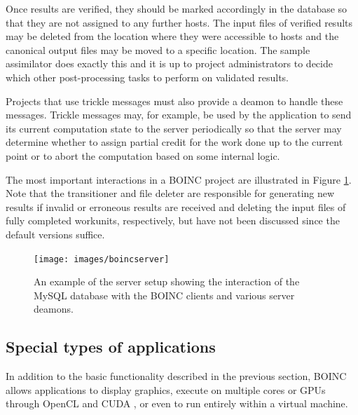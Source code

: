 Once results are verified, they should be marked accordingly in the database so that they are not assigned to any further hosts. The input files of verified results may be deleted from the location where they were accessible to hosts and the canonical output files may be moved to a specific location.
The sample assimilator does exactly this and it is up to project administrators to decide which other post-processing tasks to perform on validated results.

Projects that use   trickle messages must also provide a deamon to handle these messages. Trickle messages may, for example, be used by the application to  send its current computation state to the server periodically  so that the server may   determine whether to assign partial credit for the work done up to the current point  or   to abort the computation based on some internal logic.

The most important interactions in a BOINC project are illustrated in Figure \ref{fig:server}. Note that the transitioner and file deleter are responsible for generating new results if invalid or erroneous results are received and deleting the input files of fully completed workunits, respectively, but have not been discussed since the default versions suffice.
\begin{figure}[htb]
\centering
\texttt{[image: images/boincserver]}
%
\caption{An example of the server setup showing the interaction of the MySQL database with the BOINC clients and various server deamons.}\label{fig:server}\vspace{-.2cm}
\end{figure}

\subsection{Special types of applications} \label{Btypes}
In addition to the basic functionality described in the previous section, BOINC allows applications to display graphics, execute on multiple cores or GPUs through OpenCL \cite{opencl}  and CUDA \cite{cuda}, or even to run entirely within a virtual machine. 
